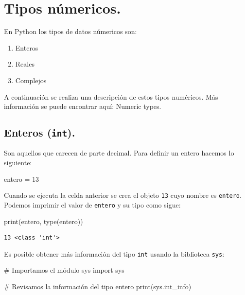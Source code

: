 \documentclass[
  spanish,
  letterpaper,
]{scrbook}
\newenvironment{Shaded}{\begin{snugshade}}{\end{snugshade}}
\newcommand{\BuiltInTok}[1]{\textcolor[rgb]{0.00,0.23,0.31}{#1}}
\newcommand{\CommentTok}[1]{\textcolor[rgb]{0.37,0.37,0.37}{#1}}
\newcommand{\DecValTok}[1]{\textcolor[rgb]{0.68,0.00,0.00}{#1}}
\newcommand{\ImportTok}[1]{\textcolor[rgb]{0.00,0.46,0.62}{#1}}
\newcommand{\NormalTok}[1]{\textcolor[rgb]{0.00,0.23,0.31}{#1}}
\newcommand{\OperatorTok}[1]{\textcolor[rgb]{0.37,0.37,0.37}{#1}}
\providecommand{\tightlist}{%
  \setlength{\itemsep}{0pt}\setlength{\parskip}{0pt}}
\theoremstyle{definition}
\theoremstyle{remark}
\begin{document}
\section{Tipos númericos.}\label{sec-b-tipos-numericos}

En Python los tipos de datos númericos son:

\begin{enumerate}
\def\labelenumi{\arabic{enumi}.}
\tightlist
\item
  Enteros
\item
  Reales
\item
  Complejos
\end{enumerate}

A continuación se realiza una descripción de estos tipos numéricos. Más
información se puede encontrar aquí: Numeric types.

\subsection{\texorpdfstring{Enteros
(\texttt{int}).}{Enteros (int).}}\label{enteros-int.}

Son aquellos que carecen de parte decimal. Para definir un entero
hacemos lo siguiente:

\begin{Shaded}
\begin{Highlighting}[]
\NormalTok{entero }\OperatorTok{=} \DecValTok{13}
\end{Highlighting}
\end{Shaded}

Cuando se ejecuta la celda anterior se crea el objeto \texttt{13} cuyo
nombre es \texttt{entero}. Podemos imprimir el valor de \texttt{entero}
y su tipo como sigue:

\begin{Shaded}
\begin{Highlighting}[]
\BuiltInTok{print}\NormalTok{(entero, }\BuiltInTok{type}\NormalTok{(entero))}
\end{Highlighting}
\end{Shaded}

\begin{verbatim}
13 <class 'int'>
\end{verbatim}

Es posible obtener más información del tipo \texttt{int} usando la
biblioteca \texttt{sys}:

\begin{Shaded}
\begin{Highlighting}[]
\CommentTok{\# Importamos el módulo sys}
\ImportTok{import}\NormalTok{ sys}

\CommentTok{\# Revisamos la información del tipo entero}
\BuiltInTok{print}\NormalTok{(sys.int\_info)}
\end{Highlighting}
\end{Shaded}
\end{document}
